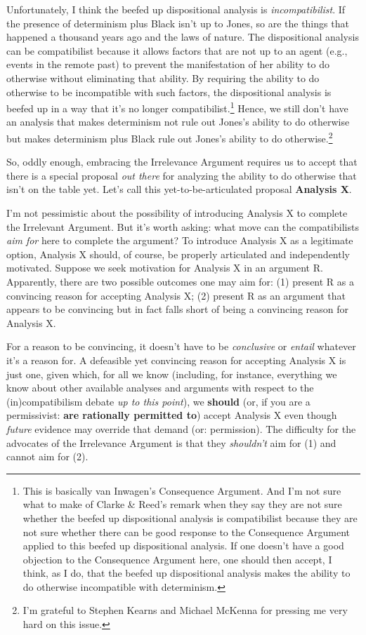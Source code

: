 \documentclass[a4paper,12pt]{article}
\begin{document}
Unfortunately, I think the beefed up dispositional analysis is \emph{incompatibilist}. If the presence of determinism plus Black isn't up to Jones, so are the things that happened a thousand years ago and the laws of nature. The dispositional analysis can be compatibilist because it allows factors that are not up to an agent (e.g., events in the remote past) to prevent the manifestation of her ability to do otherwise without eliminating that ability. By requiring the ability to do otherwise to be incompatible with such factors, the dispositional analysis is beefed up in a way that it's no longer compatibilist.\footnote{This is basically van Inwagen's Consequence Argument. And I'm not sure what to make of Clarke \& Reed's remark when they say they are not sure whether the beefed up dispositional analysis is compatibilist because they are not sure whether there can be good response to the Consequence Argument applied to this beefed up dispositional analysis. If one doesn't have a good objection to the Consequence Argument here, one should then accept, I think, as I do, that the beefed up dispositional analysis makes the ability to do otherwise incompatible with determinism.} Hence, we still don't have an analysis that makes determinism not rule out Jones's ability to do otherwise but makes determinism plus Black rule out Jones's ability to do otherwise.\footnote{I'm grateful to Stephen Kearns and Michael McKenna for pressing me very hard on this issue.}

So, oddly enough, embracing the Irrelevance Argument requires us to accept that there is a special proposal \emph{out there} for analyzing the ability to do otherwise that isn't on the table yet. Let's call this yet-to-be-articulated proposal \textbf{Analysis X}.

I'm not pessimistic about the possibility of introducing Analysis X to complete the Irrelevant Argument. But it's worth asking: what move can the compatibilists \emph{aim for} here to complete the argument? To introduce Analysis X as a legitimate option, Analysis X should, of course, be properly articulated and independently motivated. Suppose we seek motivation for Analysis X in an argument R. Apparently, there are two possible outcomes one may aim for: (1) present R as a convincing reason for accepting Analysis X; (2) present R as an argument that appears to be convincing but in fact falls short of being a convincing reason for Analysis X.

For a reason to be convincing, it doesn't have to be \emph{conclusive} or \emph{entail} whatever it's a reason for. A defeasible yet convincing reason for accepting Analysis X is just one, given which, for all we know (including, for instance, everything we know about other available analyses and arguments with respect to the (in)compatibilism debate \emph{up to this point}), we \textbf{should} (or, if you are a permissivist: \textbf{are rationally permitted to}) accept Analysis X even though \emph{future} evidence may override that demand (or: permission). The difficulty for the advocates of the Irrelevance Argument is that they \emph{shouldn't} aim for (1) and cannot aim for (2).
\end{document}
